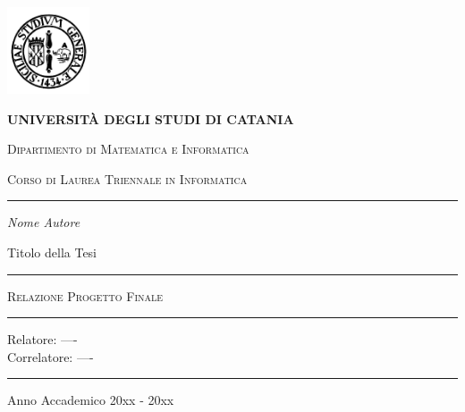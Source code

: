 \begin{titlepage}
\centering 
\includegraphics[width=2.434cm,height=2.565cm]{Images/university_logo.png}

\bigskip

{\Large \textbf{UNIVERSIT\`A DEGLI STUDI DI CATANIA}}

{\scshape
\large
Dipartimento di Matematica e Informatica
}

{\scshape
\normalsize
Corso di Laurea Triennale in Informatica
}

\bigskip


\hrule


\bigskip


\bigskip


\bigskip


\bigskip

{\itshape
\large
Nome Autore
\par}


\bigskip


\bigskip


\bigskip


\bigskip

{\centering
\Large
Titolo della Tesi
\par}


\bigskip


\bigskip


\bigskip


\bigskip


\bigskip


\bigskip


\begin{minipage}[b]{8 cm}
\hrule

\bigskip

{\centering\scshape 
Relazione Progetto Finale
\par}


\bigskip

\hrule
\end{minipage}
\bigskip


\bigskip


\bigskip


\bigskip


\bigskip


\bigskip


\bigskip


\bigskip


\bigskip


\bigskip


\bigskip

{\raggedleft
Relatore: ---- \\
Correlatore: ----
\par}


\bigskip


\bigskip


\bigskip


\bigskip

\hrule

\bigskip

{\centering
Anno Accademico 20xx - 20xx
\par}
\end{titlepage}
